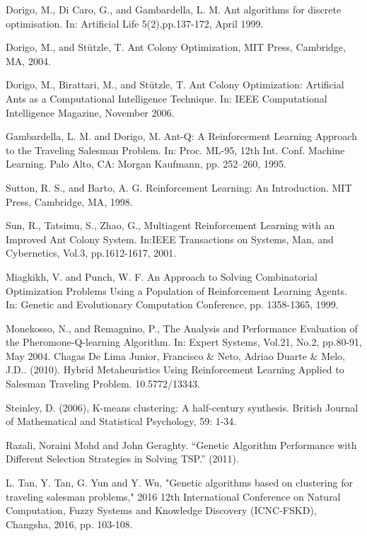 \documentclass[10pt]{article}
\begin{document}
\begin{thebibliography}{9}
Dorigo, M., Di Caro, G., and Gambardella, L. M. Ant algorithms for discrete optimisation. In: Artificial Life 5(2),pp.137-172, April 1999. 

Dorigo, M., and Stützle, T. Ant Colony Optimization, MIT Press, Cambridge, MA, 2004.

Dorigo,  M.,  Birattari,  M.,  and  Stützle,  T.  Ant Colony  Optimization:  Artificial  Ants  as  a Computational   Intelligence   Technique.  In: IEEE  Computational  Intelligence  Magazine, November 2006.

Gambardella, L. M. and Dorigo, M. Ant-Q: A Reinforcement Learning Approach to the Traveling Salesman Problem. In: Proc. ML-95, 12th Int. Conf. Machine Learning. Palo Alto, CA: Morgan Kaufmann, pp. 252–260, 1995.

Sutton,  R.  S.,  and  Barto,  A.  G. Reinforcement  Learning:  An  Introduction.  MIT  Press, Cambridge, MA, 1998.

Sun,  R.,  Tatsimu,  S.,  Zhao,  G.,  Multiagent  Reinforcement  Learning  with  an  Improved Ant  Colony  System.  In:IEEE  Transactions  on  Systems,  Man,  and  Cybernetics,  Vol.3, pp.1612-1617, 2001.

 Miagkikh,  V.  and  Punch,  W.  F.  An  Approach  to  Solving  Combinatorial  Optimization Problems   Using   a   Population   of   Reinforcement   Learning   Agents.   In: Genetic   and Evolutionary Computation Conference, pp. 1358-1365, 1999. 

 Monekosso,  N.,  and  Remagnino,  P.,  The  Analysis  and  Performance  Evaluation  of  the Pheromone-Q-learning Algorithm. In: Expert Systems, Vol.21, No.2, pp.80-91, May 2004. 
Chagas De Lima Junior, Francisco \& Neto, Adriao Duarte \& Melo, J.D.. (2010). Hybrid Metaheuristics Using Reinforcement Learning Applied to Salesman Traveling Problem. 10.5772/13343.

Steinley, D. (2006), K-means clustering: A half-century synthesis. British Journal of Mathematical and Statistical Psychology, 59: 1-34.

Razali, Noraini Mohd and John Geraghty. “Genetic Algorithm Performance with Different Selection Strategies in Solving TSP.” (2011).

L. Tan, Y. Tan, G. Yun and Y. Wu, "Genetic algorithms based on clustering for traveling salesman problems," 2016 12th International Conference on Natural Computation, Fuzzy Systems and Knowledge Discovery (ICNC-FSKD), Changsha, 2016, pp. 103-108.


\end{thebibliography}
\end{document}

